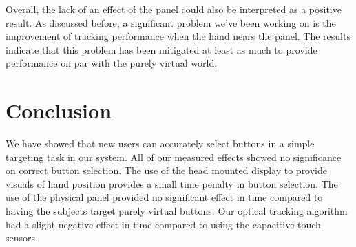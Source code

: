 Overall, the lack of an effect of the panel could also be interpreted as a positive result.
As discussed before, a significant problem we've been working on is the improvement of tracking performance when the hand nears the panel.
The results indicate that this problem has been mitigated at least as much to provide performance on par with the purely virtual world.

\section{Conclusion}


We have showed that new users can accurately select buttons in a simple targeting task in our system.
All of our measured effects showed no significance on correct button selection.
The use of the head mounted display to provide visuals of hand position provides a small time penalty in button selection.
The use of the physical panel provided no significant effect in time compared to having the subjects target purely virtual buttons.
Our optical tracking algorithm had a slight negative effect in time compared to using the capacitive touch sensors.

